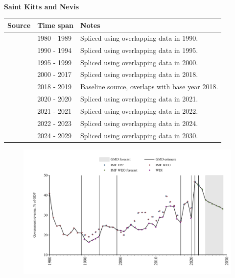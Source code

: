 \documentclass[12pt,a4paper,landscape]{article}
\begin{document}
\begin{adjustbox}{max totalsize={\paperwidth}{\paperheight},center}
\begin{minipage}[t][\textheight][t]{\textwidth}
\vspace*{0.5cm}
{}
\begin{center}
{\Large\bfseries Saint Kitts and Nevis}
\end{center}
\vspace{0.5cm}
\begin{table}[H]
\centering
\small
\begin{tabular}{|l|l|l|}
\hline
\textbf{Source} & \textbf{Time span} & \textbf{Notes} \\
\hline
\rowcolor{white}\cite{IMF_WEO}& 1980 - 1989 &Spliced using overlapping data in 1990.\\
\rowcolor{lightgray}\cite{WDI}& 1990 - 1994 &Spliced using overlapping data in 1995.\\
\rowcolor{white}\cite{IMF_WEO}& 1995 - 1999 &Spliced using overlapping data in 2000.\\
\rowcolor{lightgray}\cite{WDI}& 2000 - 2017 &Spliced using overlapping data in 2018.\\
\rowcolor{white}\cite{IMF_WEO}& 2018 - 2019 &Baseline source, overlaps with base year 2018.\\
\rowcolor{lightgray}\cite{WDI}& 2020 - 2020 &Spliced using overlapping data in 2021.\\
\rowcolor{white}\cite{IMF_WEO}& 2021 - 2021 &Spliced using overlapping data in 2022.\\
\rowcolor{lightgray}\cite{IMF_FPP}& 2022 - 2023 &Spliced using overlapping data in 2024.\\
\rowcolor{white}\cite{IMF_WEO_forecast}& 2024 - 2029 &Spliced using overlapping data in 2030.\\
\hline
\end{tabular}
\end{table}
\begin{figure}[H]
\centering
\includegraphics[width=\textwidth,height=0.6\textheight,keepaspectratio]{graphs/KNA_govrev_GDP.pdf}
\end{figure}
\end{minipage}
\end{adjustbox}
\end{document}
